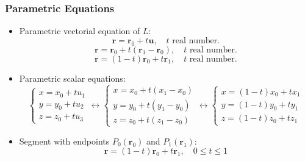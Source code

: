 
\begin{frame}
\frametitle{Parametric Equations}
    \begin{itemize}
    \item Parametric vectorial equation of $L$:
    $$\textbf{r} = \textbf{r}_0 +  t\textbf{u},  \quad t \text{ real number.}$$
  $$\textbf{r} = \textbf{r}_0 + t(\textbf{r}_1-\textbf{r}_0), \quad t \text{ real number.}$$
  $$\textbf{r} = (1-t)\textbf{r}_0 + t\textbf{r}_1, \quad t \text{ real number.}$$
  \item Parametric scalar equations:
%
$$\left\{ \begin{array}{l}
           x  = x_0 + tu_1 \\
	   y  = y_0 + tu_2 \\
           z  = z_0 + tu_3
          \end{array}
\right. \leftrightarrow \left\{ \begin{array}{l}
           x  = x_0 + t(x_1-x_0) \\
	   y  = y_0 + t(y_1-y_0) \\
           z  = z_0 + t(z_1-z_0)
          \end{array}
\right. \leftrightarrow \left\{ \begin{array}{l}
           x  = (1-t)x_0 + tx_1 \\
	   y  = (1-t)y_0 + ty_1 \\
           z  = (1-t)z_0 + tz_1
          \end{array}
\right. $$
  \item Segment with endpoints $P_0(\textbf{r}_0)$ and $P_1(\textbf{r}_1)$:
%
$$\textbf{r} = (1-t)\textbf{r}_0 + t\textbf{r}_1, \quad 0 \leqslant t \leqslant 1$$

  \end{itemize}

\end{frame}


